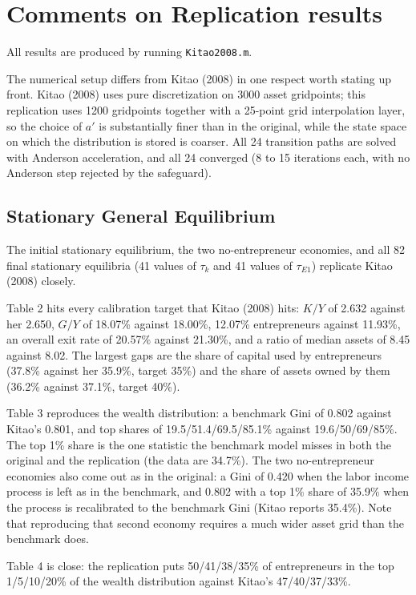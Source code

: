 \documentclass[11pt,fleqn]{article}
\begin{document}
\section{Comments on Replication results}
All results are produced by running \texttt{Kitao2008.m}.

The numerical setup differs from Kitao (2008) in one respect worth stating up front. Kitao (2008) uses pure discretization on 3000 asset gridpoints; this replication uses 1200 gridpoints together with a 25-point grid interpolation layer, so the choice of $a'$ is substantially finer than in the original, while the state space on which the distribution is stored is coarser. All 24 transition paths are solved with Anderson acceleration, and all 24 converged (8 to 15 iterations each, with no Anderson step rejected by the safeguard).

\subsection*{Stationary General Equilibrium}
The initial stationary equilibrium, the two no-entrepreneur economies, and all 82 final stationary equilibria (41 values of $\tau_k$ and 41 values of $\tau_{E1}$) replicate Kitao (2008) closely.

Table 2 hits every calibration target that Kitao (2008) hits: $K/Y$ of 2.632 against her 2.650, $G/Y$ of 18.07\% against 18.00\%, 12.07\% entrepreneurs against 11.93\%, an overall exit rate of 20.57\% against 21.30\%, and a ratio of median assets of 8.45 against 8.02. The largest gaps are the share of capital used by entrepreneurs (37.8\% against her 35.9\%, target 35\%) and the share of assets owned by them (36.2\% against 37.1\%, target 40\%).

Table 3 reproduces the wealth distribution: a benchmark Gini of 0.802 against Kitao's 0.801, and top shares of 19.5/51.4/69.5/85.1\% against 19.6/50/69/85\%. The top 1\% share is the one statistic the benchmark model misses in both the original and the replication (the data are 34.7\%). The two no-entrepreneur economies also come out as in the original: a Gini of 0.420 when the labor income process is left as in the benchmark, and 0.802 with a top 1\% share of 35.9\% when the process is recalibrated to the benchmark Gini (Kitao reports 35.4\%). Note that reproducing that second economy requires a much wider asset grid than the benchmark does.

Table 4 is close: the replication puts 50/41/38/35\% of entrepreneurs in the top 1/5/10/20\% of the wealth distribution against Kitao's 47/40/37/33\%.
\end{document}
